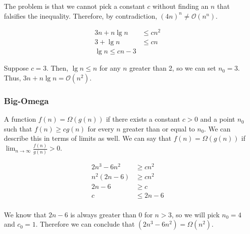The problem is that we cannot pick a constant $c$ without finding an $n$ that falsifies the inequality. Therefore, by contradiction, $(4n)^n \neq \mathcal{O}(n^n)$.


\begin{align*}
  3n + n\lg{n} &\leq cn^2\\
  3 + \lg{n} &\leq cn\\
  \lg{n} \leq cn - 3
\end{align*}

Suppose $c = 3$. Then, $\lg{n} \leq n$ for any $n$ greater than 2, so we can set $n_0 = 3$. Thus, $3n + n\lg{n} = \mathcal{O}(n^2)$.

\subsubsection*{Big-Omega}
A function $f(n) = \Omega(g(n))$ if there exists a constant $c > 0$ and a point $n_0$ such that $f(n) \geq cg(n)$ for every $n$ greater than or equal to $n_0$. We can describe this in terms of limits as well. We can say that $f(n) = \Omega(g(n))$ if $\lim_{n \to \infty} \frac{f(n)}{g(n)} > 0$.

\noindent{}


\begin{align*}
  2n^3 - 6n^2 &\geq cn^2\\
  n^2(2n - 6) &\geq cn^2\\
  2n - 6 &\geq c\\
  c &\leq 2n - 6\\
\end{align*}

We know that $2n - 6$ is always greater than $0$ for $n > 3$, so we will pick $n_0 = 4$ and $c_0 = 1$. Therefore we can conclude that $(2n^3 - 6n^2) = \Omega(n^2)$.


